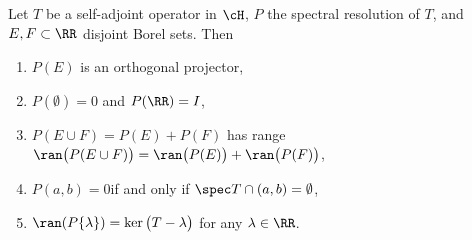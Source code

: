 \documentclass[oneside,reqno,letterpaper]{amsart}
\begin{document}
\begin{proposition}
\label{thm:SP}
  Let \(T\) be a self-adjoint operator in \(\cH\), \(P\) the spectral resolution of \(T\), and \(E, F \subset \RR\) disjoint Borel sets. 
  Then 
  \begin{enumerate}[label=(\alph*)]
    \item\label{enum:SP-prop:orthogonality} 
      \(P(E)\) is an orthogonal projector, 
    \item\label{enum:SP-prop:identity} 
      \(P(\emptyset) = 0\) and \(P(\RR) = I\), 
    \item\label{enum:SP-prop:additivity} 
      \(P(E \cup F) = P(E) + P(F)\) has range \(\ran\big(P(E \cup F)\big) = \ran\big(P(E)\big) + \ran\big(P(F)\big)\), 
    \item\label{enum:SP-prop:supp} 
    \(P(a, b) = 0\)\footnotemark if and only if \(\spec T \cap (a, b) = \emptyset\), 
    \item\label{enum:SP-prop:range} 
      \(\ran(P\{\lambda\}) = \ker\big( T - \lambda \big)\) for any \(\lambda \in \RR\).
  \end{enumerate}
\end{proposition}
\end{document}
